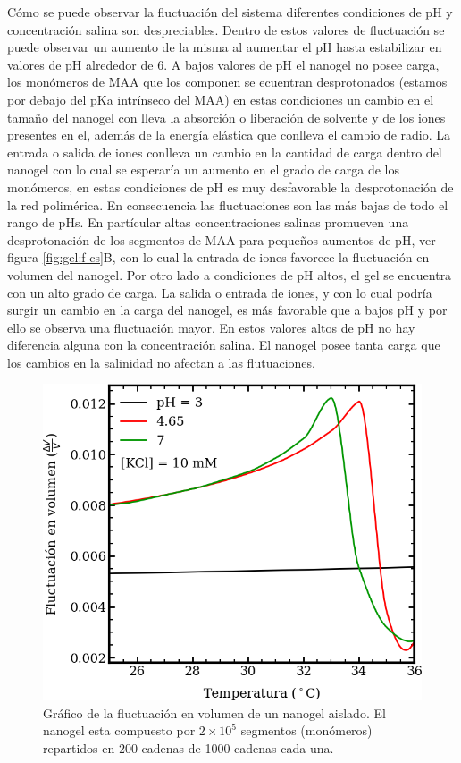 C\'omo se puede observar la fluctuaci\'on del sistema diferentes condiciones de pH y concentraci\'on salina son despreciables. 
Dentro de estos valores de fluctuaci\'on se puede observar un aumento de la misma al aumentar el pH hasta estabilizar en valores de pH alrededor de 6.
A bajos valores de pH el nanogel no posee carga, los mon\'omeros de MAA que los componen se ecuentran desprotonados (estamos por debajo del pKa intr\'inseco del MAA) en estas condiciones un cambio en el tama\~no del nanogel con lleva la absorci\'on o liberaci\'on de solvente y de los iones presentes en el, adem\'as de la energ\'ia el\'astica que conlleva el cambio de radio.
La entrada o salida de iones conlleva un cambio en la cantidad de carga dentro del nanogel con lo cual se esperar\'ia un aumento en el grado de carga de los mon\'omeros, en estas condiciones de pH es muy desfavorable la desprotonaci\'on de la red polim\'erica. En consecuencia las fluctuaciones son las m\'as bajas de todo el rango de pHs.
En part\'icular altas concentraciones salinas promueven una desprotonaci\'on de los segmentos de MAA para peque\~nos aumentos de pH, ver figura \ref{fig:gel:f-cs}B, con lo cual la entrada de iones favorece la fluctuaci\'on en volumen del nanogel. 
Por otro lado a condiciones de pH altos, el gel se encuentra con un alto grado de carga. La salida o entrada de iones, y  con lo cual podr\'ia surgir un cambio en la carga del nanogel,  es m\'as favorable que a bajos pH y por ello se observa una fluctuaci\'on mayor. En estos valores altos de pH no hay diferencia alguna con la concentraci\'on salina. El nanogel posee tanta carga que los cambios en la salinidad no afectan a las flutuaciones.





\begin{figure}[!tb]
	\centering
	\includegraphics[width=0.45\linewidth]{Figures/graph-mc/fluct-T.png}
	\caption{Gr\'afico de la fluctuaci\'on en volumen de un nanogel aislado. El nanogel esta compuesto por $2\times 10^5$ segmentos (mon\'omeros) repartidos en 200 cadenas de 1000 cadenas cada una.}
	\label{fig:mc:dvv-Ti}
\end{figure}

